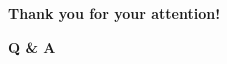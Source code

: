 \documentclass[handout,compress]{beamer} %
\begin{document}
\begin{frame}
	
	\begin{center}
		\Huge \textbf{Thank you for your attention!}
	\end{center}

\end{frame}
\begin{frame}
	
	\begin{center}
		\Huge \textbf{Q \& A}
	\end{center}

\end{frame}



\end{document}
